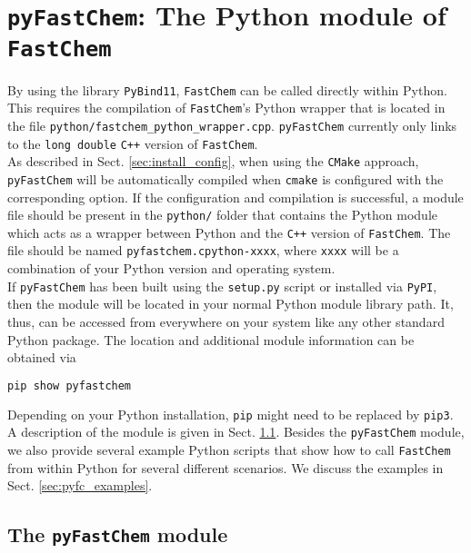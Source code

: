 \documentclass[numbers=noenddot]{aux/fcmanual}
\newcommand{\fc}{\texttt{FastChem}\xspace}
\newcommand{\pfc}{\texttt{pyFastChem}\xspace}
\newcommand{\cpp}{\ttt{C++}\xspace}
\newcommand{\pb}{\texttt{PyBind11}\xspace}
\newcommand{\ttt}[1]{\texttt {#1}}
\begin{document}

\chapter{\pfc: The Python module of \fc}
\label{sec:pyfc_details}

By using the library \pb, \fc can be called directly within Python. This requires the compilation of \fc's Python wrapper that is located in the file \verb|python/fastchem_python_wrapper.cpp|. \pfc currently only links to the \lstinline!long double! \cpp version of \fc.\\

As described in Sect. \ref{sec:install_config}, when using the \ttt{CMake} approach, \pfc will be automatically compiled when \ttt{cmake} is configured with the corresponding option. If the configuration and compilation is successful, a module file should be present in the \verb|python/| folder that contains the Python module which acts as a wrapper between Python and the \cpp version of \fc. The file should be named \verb|pyfastchem.cpython-xxxx|, where \verb|xxxx| will be a combination of your Python version and operating system.\\ 

If \pfc has been built using the \verb|setup.py| script or installed via \verb|PyPI|, then the module will be located in your normal Python module library path. It, thus, can be accessed from everywhere on your system like any other standard Python package. The location and additional module information can be obtained via
\begin{lstlisting}[language=bash]
  pip show pyfastchem
\end{lstlisting}
Depending on your Python installation, \verb|pip| might need to be replaced by \verb|pip3|.\\


A description of the module is given in Sect. \ref{sec:pyfc_module}. Besides the \pfc module, we also provide several example Python scripts that show how to call \fc from within Python for several different scenarios. We discuss the examples in Sect. \ref{sec:pyfc_examples}.


\section{The \pfc module}
\label{sec:pyfc_module}
\end{document}
